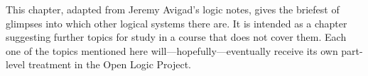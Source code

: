 \documentclass[../../../include/open-logic-chapter]{subfiles}
\begin{document}

\begin{editorial}
  This chapter, adapted from Jeremy Avigad's logic notes, gives the
  briefest of glimpses into which other logical systems there are. It
  is intended as a chapter suggesting further topics for study in a
  course that does not cover them.  Each one of the topics mentioned
  here will---hopefully---eventually receive its own part-level
  treatment in the Open Logic Project.
\end{editorial}








\OLEndChapterHook
\end{document}

